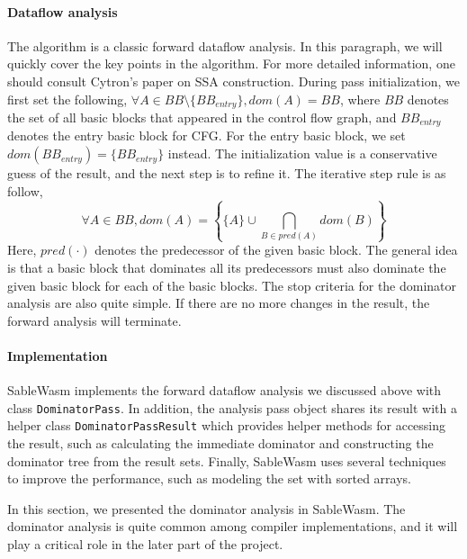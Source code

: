 \paragraph{Dataflow analysis}
The algorithm is a classic forward dataflow analysis. In this paragraph, we will
quickly cover the key points in the algorithm. For more detailed information,
one should consult Cytron's paper on SSA construction. During pass
initialization, we first set the following,
$\forall A \in BB \setminus \{ BB_{entry} \}, dom(A) = BB$,
where $BB$ denotes the set of all basic blocks that appeared in the control flow
graph, and $BB_{entry}$ denotes the entry basic block for CFG. For the entry
basic block, we set $dom(BB_{entry}) = \{ BB_{entry} \}$ instead. The
initialization value is a conservative guess of the result, and the next step is
to refine it. The iterative step rule is as follow,
$$
    \forall A \in BB, dom(A) =
    \left\{\{ A \} \cup \bigcap_{B \in pred(A)} dom(B)\right\}
$$
Here, $pred(\cdot)$ denotes the predecessor of the given basic block. The
general idea is that a basic block that dominates all its predecessors must also
dominate the given basic block for each of the basic blocks. The stop criteria
for the dominator analysis are also quite simple. If there are no more changes
in the result, the forward analysis will terminate.

\paragraph{Implementation}
SableWasm implements the forward dataflow analysis we discussed above with class
\texttt{DominatorPass}. In addition, the analysis pass object shares its result
with a helper class \texttt{DominatorPassResult} which provides helper
methods for accessing the result, such as calculating the immediate dominator
and constructing the dominator tree from the result sets. Finally, SableWasm
uses several techniques to improve the performance, such as modeling the set
with sorted arrays.

In this section, we presented the dominator analysis in SableWasm. The dominator
analysis is quite common among compiler implementations, and it will play a
critical role in the later part of the project.